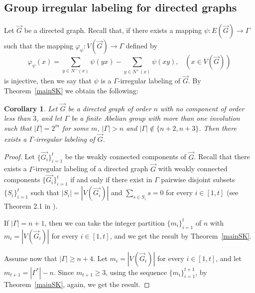 \documentclass[final]{dmtcs-episciences}
\newtheorem{cor}[thm]{Corollary}
\begin{document}
\subsection{Group irregular labeling for directed graphs}\label{subsec:gild}
Let $\overrightarrow{G}$ be  a directed graph. 
Recall that, if there exists a mapping $\psi\colon E(\overrightarrow{G})\rightarrow\Gamma$ such that the mapping $\varphi_{\psi}\colon V(\overrightarrow{G})\rightarrow\Gamma$ defined by
$$\varphi_{\psi}(x)=\sum_{y\in N^-(x)}\psi(yx)-\sum_{y\in N^+(x)}\psi(xy),\;\;\;(x\in V(\overrightarrow{G}))$$
is injective, then we say that $\psi$ is a $\Gamma$-irregular labeling of $\overrightarrow{G}$. By Theorem~\ref{mainSK} we obtain the following:
\begin{cor} Let $\overrightarrow{G}$ be a directed graph of order $n$ with no component of order less than $3$, and let $\Gamma$ be a finite Abelian group with more than one involution such that $|\Gamma|=2^m$ for some $m$, $|\Gamma|> n$  and $|\Gamma|\not\in\{n+2,n+3\}$.  Then there exists a $\Gamma$-irregular labeling of $\overrightarrow{G}$.\end{cor}
\begin{proof}
Let $\{\overrightarrow{G_i}\}_{i=1}^t$ be the weakly connected components of $\overrightarrow{G}$. Recall that there exists a $\Gamma$-irregular labeling of a directed graph $\overrightarrow{G}$ with weakly connected components $\{\overrightarrow{G_i}\}_{i=1}^t$ if and only if there exist in $\Gamma$ pairwise disjoint subsets $\{S_i\}_{i=1}^t$ such that $|S_i|=|V(\overrightarrow{G_i})|$  and $\sum_{s\in S_i}s=0$ for every {$i\in[1 ,t]$} {(see Theorem 2.1 in \citet{CicTuz})}.

If $|\Gamma|=n+1$, then we can take the integer partition $\{m_i\}_{i=1}^t$ of $n$ with $m_i = |V(\overrightarrow{G}_i)|$ for every $i\in[1,t]$, and we get the result by Theorem~\ref{mainSK}.

Assume now that $|\Gamma|\geq n+4$. Let $m_i=|V(\overrightarrow{G}_i)|$ for every $i\in[1,t]$, and let $m_{t+1}=|\Gamma^*|-n$. Since $m_{t+1}\geq 3$, using the sequence $\{m_i\}_{i=1}^{t+1}$, by Theorem~\ref{mainSK}, again, we get the result.
\end{proof}
\end{document}
